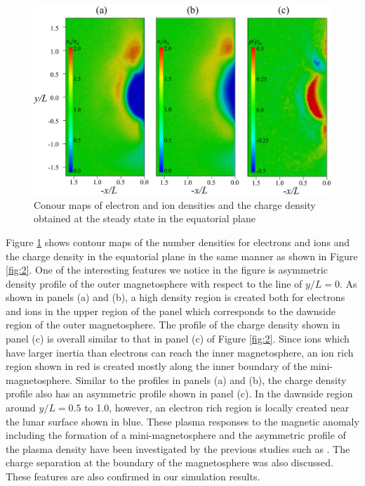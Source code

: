 \documentclass[draft,jgrga]{agutex2015}
\begin{document}
\begin{article}

\begin{figure}[t]
\centering
\noindent\includegraphics[width=15cm]{./figures/Fig_3_bb-crop.pdf}
\caption{Conour maps of electron and ion densities and the charge density 
obtained at the steady state in the equatorial plane}\label{fig:3}
\end{figure}

Figure \ref{fig:3} shows contour maps of the number densities 
for electrons and ions and the charge density in the equatorial plane 
in the same manner as shown in Figure \ref{fig:2}. 
One of the interesting features we notice in the figure is 
asymmetric density profile of the outer magnetosphere 
with respect to the line of $y/L =0$.
As shown in panels (a) and (b), a high density region is created 
both for electrons and ions in the upper region of the panel
which corresponds to the dawnside region of the outer magnetosphere. 
The profile of the charge density shown in panel (c) is overall 
similar to that in panel (c) of Figure \ref{fig:2}. 
Since ions which have larger inertia than electrons can reach the inner magnetosphere, 
an ion rich region shown in red is created mostly 
along the inner boundary of the mini-magnetosphere. 
Similar to the profiles in panels (a) and (b), 
the charge density profile also has an asymmetric profile shown in panel (c). 
In the dawnside region around $y/L = 0.5$ to 1.0, however, 
an electron rich region is locally created near the lunar surface shown in blue. 
These plasma responses to the magnetic anomaly 
including the formation of a mini-magnetosphere and 
the asymmetric profile of the plasma density have been investigated 
by the previous studies such as
\citep[e.g.][]{Harnett2002,Kallio2012,Poppe2012a,Deca2014,Deca2015}.
The charge separation at the boundary of the magnetosphere was also discussed.
These features are also confirmed in our simulation results.


\end{article}
\end{document}
